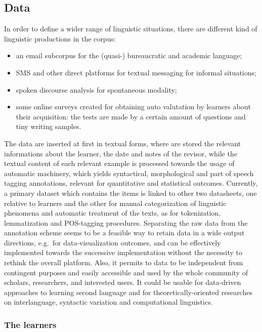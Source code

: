 \documentclass[a4paper,twoside,11pt,chapterprefix=false,bibliography=totocnumbered]{scrbook}
\providecommand{\tightlist}{%
  \setlength{\itemsep}{0pt}\setlength{\parskip}{0pt}}
\theoremstyle{definition}
\theoremstyle{definition}
\theoremstyle{definition}
\theoremstyle{remark}
\begin{document}
\subsection{Data}\label{data}

In order to define a wider range of linguistic situations, there are
different kind of linguistic productions in the corpus:

\begin{itemize}
\tightlist
\item
  an email subcorpus for the (quasi-) bureaucratic and academic
  language;
\item
  SMS and other direct platforms for textual messaging for informal
  situations;
\item
  spoken discourse analysis for spontaneous modality;
\item
  some online surveys created for obtaining auto valutation by learners
  about their acquisition: the tests are made by a certain amount of
  questions and tiny writing samples.
\end{itemize}

The data are inserted at first in textual forms, where are stored the
relevant informations about the learner, the date and notes of the
revisor, while the textual content of each relevant example is processed
towards the usage of automatic machinery, which yields syntactical,
morphological and part of speech tagging annotations, relevant for
quantitative and statistical outcomes. Currently, a primary dataset
which contains the items is linked to other two datasheets, one relative
to learners and the other for manual categorization of linguistic
phenomena and automatic treatment of the texts, as for tokenization,
lemmatization and POS-tagging procedures. Separating the raw data from
the annotation scheme seems to be a feasible way to retain data in a
wide output directions, e.g.~for data-visualization outcomes, and can be
effectively implemented towards the successive implementation without
the necessity to rethink the overall platform. Also, it permits to data
to be independent from contingent purposes and easily accessible and
used by the whole community of scholars, researchers, and interested
users. It could be usable for data-driven approaches to learning second
language and for theoretically-oriented researches on interlanguage,
syntactic variation and computational linguistics.

\subsubsection{The learners}\label{the-learners}
\end{document}
